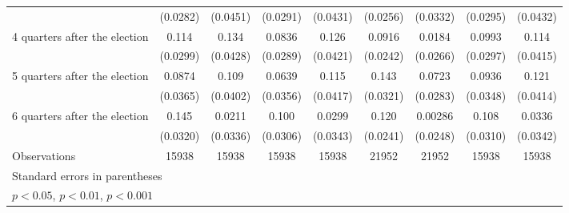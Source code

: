 \begin{table}[htbp]
\begin{tabular}{l*{8}{c}}
                    &    (0.0282)         &    (0.0451)         &    (0.0291)         &    (0.0431)         &    (0.0256)         &    (0.0332)         &    (0.0295)         &    (0.0432)         \\
[1em]
 4 quarters after the election&       0.114\sym{***}&       0.134\sym{**} &      0.0836\sym{**} &       0.126\sym{**} &      0.0916\sym{***}&      0.0184         &      0.0993\sym{***}&       0.114\sym{**} \\
                    &    (0.0299)         &    (0.0428)         &    (0.0289)         &    (0.0421)         &    (0.0242)         &    (0.0266)         &    (0.0297)         &    (0.0415)         \\
[1em]
 5 quarters after the election&      0.0874\sym{*}  &       0.109\sym{**} &      0.0639         &       0.115\sym{**} &       0.143\sym{***}&      0.0723\sym{*}  &      0.0936\sym{**} &       0.121\sym{**} \\
                    &    (0.0365)         &    (0.0402)         &    (0.0356)         &    (0.0417)         &    (0.0321)         &    (0.0283)         &    (0.0348)         &    (0.0414)         \\
[1em]
 6 quarters after the election&       0.145\sym{***}&      0.0211         &       0.100\sym{**} &      0.0299         &       0.120\sym{***}&     0.00286         &       0.108\sym{***}&      0.0336         \\
                    &    (0.0320)         &    (0.0336)         &    (0.0306)         &    (0.0343)         &    (0.0241)         &    (0.0248)         &    (0.0310)         &    (0.0342)         \\
\hline
Observations        &       15938         &       15938         &       15938         &       15938         &       21952         &       21952         &       15938         &       15938         \\
\hline\hline
\multicolumn{9}{l}{\footnotesize Standard errors in parentheses}\\
\multicolumn{9}{l}{\footnotesize \sym{*} \(p<0.05\), \sym{**} \(p<0.01\), \sym{***} \(p<0.001\)}\\
\end{tabular}
\end{table}
